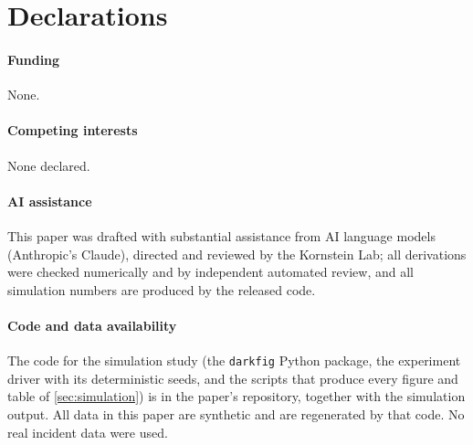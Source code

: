 \documentclass[11pt]{article}
\begin{document}

\section*{Declarations}
\paragraph{Funding} None.
\paragraph{Competing interests} None declared.
\paragraph{AI assistance} This paper was drafted with substantial assistance
from AI language models (Anthropic's Claude), directed and reviewed by the
Kornstein Lab; all derivations were checked numerically and by independent
automated review, and all simulation numbers are produced by the released
code.
\paragraph{Code and data availability} The code for the simulation study (the
\texttt{darkfig} Python package, the experiment driver with its deterministic
seeds, and the scripts that produce every figure and table of
\cref{sec:simulation}) is in the paper's repository, together with the
simulation output. All data in this paper are synthetic and are regenerated by
that code. No real incident data were used.
\end{document}
